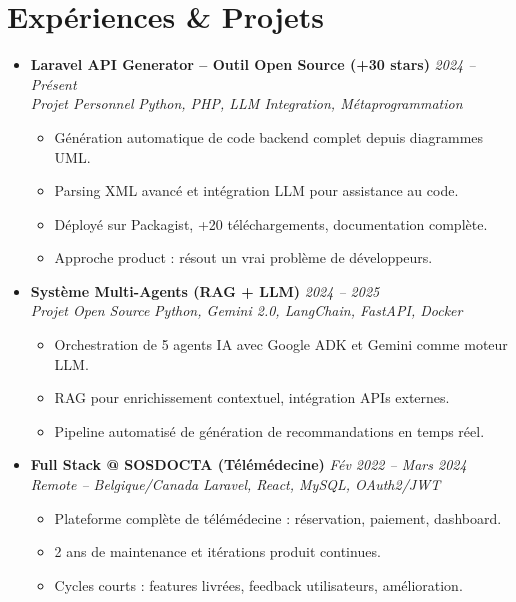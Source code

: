 \documentclass[a4paper,11pt]{article}
\begin{document}
\section{Expériences \& Projets}
\begin{itemize}[leftmargin=*, label={-}]

\item \textbf{Laravel API Generator -- Outil Open Source (+30 stars)} \hfill \textit{2024 -- Présent} \\
\textit{Projet Personnel} \hfill \textit{Python, PHP, LLM Integration, Métaprogrammation}
\vspace{-2pt}
    \begin{itemize}[leftmargin=0.4cm, nosep, label=\tiny$\bullet$]
        \item \small{Génération automatique de code backend complet depuis diagrammes UML.}
        \item \small{Parsing XML avancé et intégration LLM pour assistance au code.}
        \item \small{Déployé sur Packagist, +20 téléchargements, documentation complète.}
        \item \small{Approche product : résout un vrai problème de développeurs.}
    \end{itemize}
\vspace{3pt}

\item \textbf{Système Multi-Agents (RAG + LLM)} \hfill \textit{2024 -- 2025} \\
\textit{Projet Open Source} \hfill \textit{Python, Gemini 2.0, LangChain, FastAPI, Docker}
\vspace{-2pt}
    \begin{itemize}[leftmargin=0.4cm, nosep, label=\tiny$\bullet$]
        \item \small{Orchestration de 5 agents IA avec Google ADK et Gemini comme moteur LLM.}
        \item \small{RAG pour enrichissement contextuel, intégration APIs externes.}
        \item \small{Pipeline automatisé de génération de recommandations en temps réel.}
    \end{itemize}
\vspace{3pt}

\item \textbf{Full Stack @ SOSDOCTA (Télémédecine)} \hfill \textit{Fév 2022 -- Mars 2024} \\
\textit{Remote -- Belgique/Canada} \hfill \textit{Laravel, React, MySQL, OAuth2/JWT}
\vspace{-2pt}
    \begin{itemize}[leftmargin=0.4cm, nosep, label=\tiny$\bullet$]
        \item \small{Plateforme complète de télémédecine : réservation, paiement, dashboard.}
        \item \small{2 ans de maintenance et itérations produit continues.}
        \item \small{Cycles courts : features livrées, feedback utilisateurs, amélioration.}
    \end{itemize}
\vspace{3pt}


\end{itemize}
\end{document}
